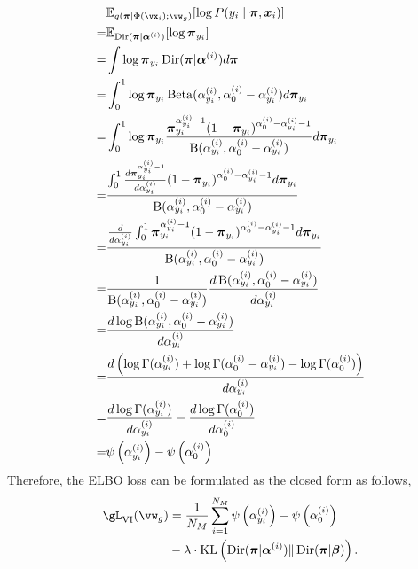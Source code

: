\begin{align}
&\mathbb{E}_{q(\boldsymbol{\pi}| \Phi(\vx_i); \vw_g)}[\log P(y_i \mid \boldsymbol{\pi}, \boldsymbol{x}_i)] \nonumber \\
=& \mathbb{E}_{ \operatorname{Dir}(\boldsymbol{\pi}| \boldsymbol{\alpha}^{(i)})}[\log \boldsymbol{\pi}_{y_i}]\\
=& \int \log \boldsymbol{\pi}_{y_i} \operatorname{Dir}(\boldsymbol{\pi}| \boldsymbol{\alpha}^{(i)}) d\boldsymbol{\pi}\\
=&\int_{0}^{1} \log \boldsymbol{\pi}_{y_i} \operatorname{Beta}(\alpha^{(i)}_{y_i}, \alpha^{(i)}_{0}-\alpha^{(i)}_{y_i}) d\boldsymbol{\pi}_{y_i}\\
=& \int_{0}^{1} \log \boldsymbol{\pi}_{y_i} \frac {\boldsymbol{\pi}_{y_i}^{\alpha^{(i)}_{y_i}-1}(1-\boldsymbol{\pi}_{y_i})^{\alpha^{(i)}_{0}-\alpha^{(i)}_{y_i}-1}} {\operatorname{B}(\alpha^{(i)}_{y_i}, \alpha^{(i)}_{0}-\alpha^{(i)}_{y_i})} d\boldsymbol{\pi}_{y_i}\\
=& \frac {\int_{0}^{1} \frac {d \boldsymbol{\pi}_{y_i}^{\alpha^{(i)}_{y_i}-1}}{d\alpha^{(i)}_{y_i}}(1-\boldsymbol{\pi}_{y_i})^{\alpha^{(i)}_{0}-\alpha^{(i)}_{y_i}-1} d\boldsymbol{\pi}_{y_i}}
{\operatorname{B}(\alpha^{(i)}_{y_i}, \alpha^{(i)}_{0}-\alpha^{(i)}_{y_i})} \\
=& \frac { \frac{d}{d\alpha^{(i)}_{y_i}}  \int_{0}^{1}  \boldsymbol{\pi}_{y_i}^{\alpha^{(i)}_{y_i}-1} (1-\boldsymbol{\pi}_{y_i})^{\alpha^{(i)}_{0}-\alpha^{(i)}_{y_i}-1} d\boldsymbol{\pi}_{y_i}}
{\operatorname{B}(\alpha^{(i)}_{y_i}, \alpha^{(i)}_{0}-\alpha^{(i)}_{y_i})} \\
=& \frac {1} {\operatorname{B}(\alpha^{(i)}_{y_i}, \alpha^{(i)}_{0}-\alpha^{(i)}_{y_i})} \frac {d\operatorname{B}(\alpha^{(i)}_{y_i}, \alpha^{(i)}_{0}-\alpha^{(i)}_{y_i})} {d\alpha^{(i)}_{y_i}}\\
=& \frac {d \log \operatorname{B}(\alpha^{(i)}_{y_i}, \alpha^{(i)}_{0}-\alpha^{(i)}_{y_i})} {d\alpha^{(i)}_{y_i}}\\
=& \frac {d \left(\log \Gamma(\alpha^{(i)}_{y_i})+ \log \Gamma(\alpha^{(i)}_{0}-\alpha^{(i)}_{y_i}) - \log \Gamma(\alpha^{(i)}_{0})\right)} {d\alpha^{(i)}_{y_i}}\\
=& \frac {d \log \Gamma(\alpha^{(i)}_{y_i})}{d\alpha^{(i)}_{y_i}} - \frac {d \log \Gamma(\alpha^{(i)}_{0})}{d\alpha^{(i)}_{0}}\\
=& \psi\left(\alpha^{(i)}_{y_i}\right)-\psi\left(\alpha^{(i)}_{0}\right)
\end{align}  
Therefore, the ELBO loss can be formulated as the closed form as follows,
\begin{align}
\gL_{\mathrm{VI}}(\vw_g) 
&= \frac{1}{N_M}\sum_{i=1}^{N_M} \psi\left(\alpha^{(i)}_{y_i}\right)-\psi\left(\alpha^{(i)}_{0}\right)  \nonumber\\
&- \lambda\cdot \mathrm{KL}\left( \operatorname{Dir}(\boldsymbol{\pi}| \boldsymbol{\alpha}^{(i)}) \| \operatorname{Dir}(\boldsymbol{\pi} | \boldsymbol{\beta})\right).
\end{align}




